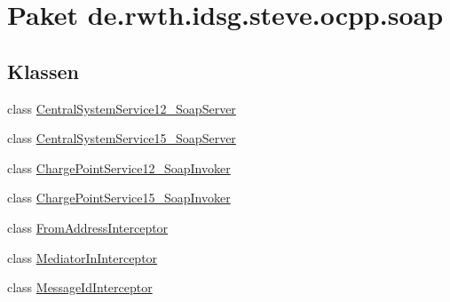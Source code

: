 \hypertarget{namespacede_1_1rwth_1_1idsg_1_1steve_1_1ocpp_1_1soap}{\section{Paket de.\-rwth.\-idsg.\-steve.\-ocpp.\-soap}
\label{namespacede_1_1rwth_1_1idsg_1_1steve_1_1ocpp_1_1soap}
}
\subsection*{Klassen}
\begin{DoxyCompactItemize}
\item 
class \hyperlink{classde_1_1rwth_1_1idsg_1_1steve_1_1ocpp_1_1soap_1_1_central_system_service12___soap_server}{Central\-System\-Service12\-\_\-\-Soap\-Server}
\item 
class \hyperlink{classde_1_1rwth_1_1idsg_1_1steve_1_1ocpp_1_1soap_1_1_central_system_service15___soap_server}{Central\-System\-Service15\-\_\-\-Soap\-Server}
\item 
class \hyperlink{classde_1_1rwth_1_1idsg_1_1steve_1_1ocpp_1_1soap_1_1_charge_point_service12___soap_invoker}{Charge\-Point\-Service12\-\_\-\-Soap\-Invoker}
\item 
class \hyperlink{classde_1_1rwth_1_1idsg_1_1steve_1_1ocpp_1_1soap_1_1_charge_point_service15___soap_invoker}{Charge\-Point\-Service15\-\_\-\-Soap\-Invoker}
\item 
class \hyperlink{classde_1_1rwth_1_1idsg_1_1steve_1_1ocpp_1_1soap_1_1_from_address_interceptor}{From\-Address\-Interceptor}
\item 
class \hyperlink{classde_1_1rwth_1_1idsg_1_1steve_1_1ocpp_1_1soap_1_1_mediator_in_interceptor}{Mediator\-In\-Interceptor}
\item 
class \hyperlink{classde_1_1rwth_1_1idsg_1_1steve_1_1ocpp_1_1soap_1_1_message_id_interceptor}{Message\-Id\-Interceptor}
\end{DoxyCompactItemize}
